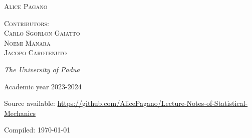 \begin{titlepage}
	{\scshape\Large Alice Pagano \\} %
	
	\vspace{0.5\baselineskip} %
	
	{\scshape Contributors: \\ Carlo Sgorlon Gaiatto \\ Noemi Manara \\ Jacopo Carotenuto}
	
	\vspace{1\baselineskip}
	\textit{The University of Padua } %
	
	
	\vspace{0.5\baselineskip}
	
	\small Academic year 2023-2024
	
	\vspace{4cm}
	
	Source available: \url{https://github.com/AlicePagano/Lecture-Notes-of-Statistical-Mechanics}
	\vspace{2cm}
	
	\footnotesize Compiled: \today %
	\vspace{0.5\baselineskip} 
	
	\vfill %

\end{titlepage}

\clearpage{\pagestyle{empty}\cleardoublepage}
